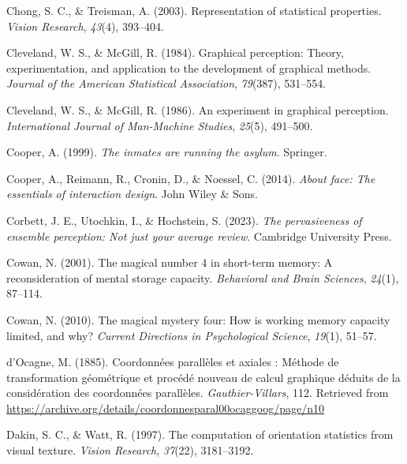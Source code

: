 \documentclass[print]{nuthesis}
\newlength{\cslhangindent}
\newenvironment{CSLReferences}[2]%
{\setlength{\parindent}{0pt}%
\everypar{\setlength{\hangindent}{\cslhangindent}}\ignorespaces}%
{\par}
\begin{document}
\begin{CSLReferences}{1}{0}
\leavevmode{}%
Chong, S. C., \& Treisman, A. (2003). Representation of statistical properties. \emph{Vision Research}, \emph{43}(4), 393--404.

\leavevmode{}%
Cleveland, W. S., \& McGill, R. (1984). Graphical perception: Theory, experimentation, and application to the development of graphical methods. \emph{Journal of the American Statistical Association}, \emph{79}(387), 531--554.

\leavevmode{}%
Cleveland, W. S., \& McGill, R. (1986). An experiment in graphical perception. \emph{International Journal of Man-Machine Studies}, \emph{25}(5), 491--500.

\leavevmode{}%
Cooper, A. (1999). \emph{The inmates are running the asylum}. Springer.

\leavevmode{}%
Cooper, A., Reimann, R., Cronin, D., \& Noessel, C. (2014). \emph{About face: The essentials of interaction design}. John Wiley \& Sons.

\leavevmode{}%
Corbett, J. E., Utochkin, I., \& Hochstein, S. (2023). \emph{The pervasiveness of ensemble perception: Not just your average review}. Cambridge University Press.

\leavevmode{}%
Cowan, N. (2001). The magical number 4 in short-term memory: A reconsideration of mental storage capacity. \emph{Behavioral and Brain Sciences}, \emph{24}(1), 87--114.

\leavevmode{}%
Cowan, N. (2010). The magical mystery four: How is working memory capacity limited, and why? \emph{Current Directions in Psychological Science}, \emph{19}(1), 51--57.

\leavevmode{}%
d'Ocagne, M. (1885). {Coordonnées parallèles et axiales : Méthode de transformation géométrique et procédé nouveau de calcul graphique déduits de la considération des coordonnées parallèles}. \emph{Gauthier-Villars}, 112. Retrieved from \url{https://archive.org/details/coordonnesparal00ocaggoog/page/n10}

\leavevmode{}%
Dakin, S. C., \& Watt, R. (1997). The computation of orientation statistics from visual texture. \emph{Vision Research}, \emph{37}(22), 3181--3192.


\end{CSLReferences}
\end{document}
